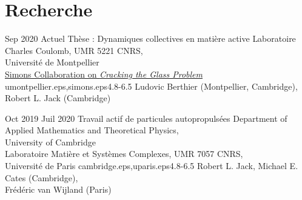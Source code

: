 \documentclass[letterpaper]{cvtemplate_fr} %
\begin{document}
\makeprofile %


\vspace{\parskip}
\section{Recherche}

\begin{cvbody}

\cvitem
	{Sep 2020}
	{Actuel}
  {Thèse : Dynamiques collectives en mati\`ere active}
  {Laboratoire Charles Coulomb, UMR 5221 CNRS,\\ Universit\'e de Montpellier \\
  \href{https://scglass.uchicago.edu}{Simons Collaboration on \textit{Cracking the Glass Problem}}}
	{umontpellier.eps,simons.eps}{4.8}{-6.5}
	{Ludovic Berthier (Montpellier, Cambridge),\\ Robert L. Jack (Cambridge)}
  {\\}

\cvitem
	{Oct 2019}
	{Juil 2020}
  {Travail actif de particules autopropuls\'ees}
  {Department of Applied Mathematics and Theoretical Physics,\\ University of Cambridge \\
	Laboratoire Mati\`ere et Syst\`emes Complexes, UMR 7057 CNRS,\\ Universit\'e de Paris }
	{cambridge.eps,uparis.eps}{4.8}{-6.5}
	{Robert L. Jack, Michael E. Cates (Cambridge),\\ Fr\'ed\'eric van Wijland (Paris)}
  {\\}


\end{cvbody}
\end{document}
